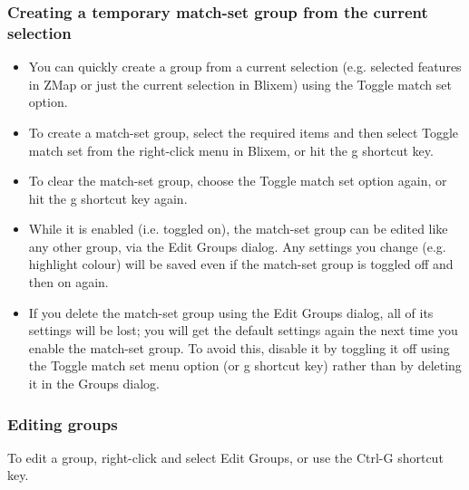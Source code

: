 \documentclass[letterpaper]{article}
\newcommand\liststyleWWviiiNumxvi{%
\renewcommand\labelitemi{{\textbullet}}
\renewcommand\labelitemii{o}
\renewcommand\labelitemiii{[F0A7?]}
\renewcommand\labelitemiv{[F0B7?]}
}
\begin{document}
{\color[rgb]{0.30980393,0.5058824,0.7411765}\subsubsection[Creating a temporary
{\textquotesingle}match{}-set{\textquotesingle} group from the current
selection]{Creating a temporary
{\textquotesingle}match-set{\textquotesingle} group from the current
selection}}
\hypertarget{RefHeading2121056909880}{}\liststyleWWviiiNumxvi
\begin{itemize}
\item {You can quickly create a group from a current selection (e.g. selected features in ZMap or just the current selection in Blixem) using the {\textquotesingle}Toggle match set{\textquotesingle} option.}
\item {To create a match-set group, select the required items and then select {\textquotesingle}Toggle match set{\textquotesingle} from the right-click menu in Blixem, or hit the {\textquotesingle}g{\textquotesingle} shortcut key.}
\item {To clear the match-set group, choose the {\textquotesingle}Toggle match set{\textquotesingle} option again, or hit the {\textquotesingle}g{\textquotesingle} shortcut key again.}
\item {While it is enabled (i.e. toggled on), the match-set group can be edited like any other group, via the {\textquotesingle}Edit Groups{\textquotesingle} dialog. Any settings you change (e.g. highlight colour) will be saved even if the match-set group is toggled off and then on again.}
\item {If you delete the match-set group using the {\textquotesingle}Edit Groups{\textquotesingle} dialog, all of its settings will be lost; you will get the default settings again the next time you enable the match-set group. To avoid this, disable it by toggling it off using the {\textquotesingle}Toggle match set{\textquotesingle} menu option (or {\textquotesingle}g{\textquotesingle} shortcut key) rather than by deleting it in the Groups dialog.}
\end{itemize}

{\color[rgb]{0.30980393,0.5058824,0.7411765}\subsubsection[Editing groups]{Editing groups}}
\hypertarget{RefHeading2141056909880}{}{
To edit a group, right-click and select {\textquotesingle}Edit
Groups{\textquotesingle}, or use the Ctrl-G shortcut key.}
\end{document}

